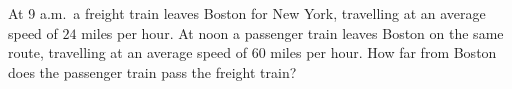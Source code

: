 At 9 a.m.\ a freight train leaves Boston for New York, travelling at an average speed of $24$ miles per hour. At noon a passenger train leaves Boston on the same route, travelling at an average speed of $60$ miles per hour. How far from Boston does the passenger train pass the freight train?
